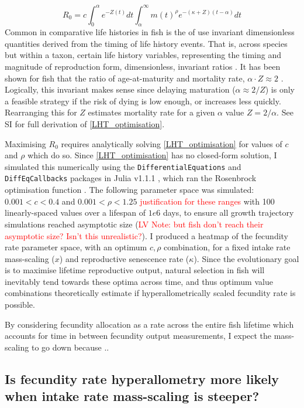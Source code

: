 \documentclass[a4paper]{article} %
\begin{document}
\begin{equation}
    R_{0} = c\int_{0}^{\alpha}e^{-Z(t)}dt\int_{\alpha}^{\infty} m(t)^{\rho} e^{-(\kappa+Z)(t-\alpha)} dt \label{LHT_optimisation}
\end{equation}
Common in comparative life histories in fish is the of use invariant dimensionless quantities derived from the timing of life history events. That is, across species but within a taxon, certain life history variables, representing the timing and magnitude of reproduction form, dimensionless, invariant ratios \autocite{Charnov1990-invariant, Charnov1993}. It has been shown for fish that the ratio of age-at-maturity and mortality rate, $\alpha\cdot Z \approx 2$ \autocite{Charnov1993}. Logically, this invariant makes sense since delaying maturation ($\alpha \approx 2/Z$) is only a feasible strategy if the risk of dying is low enough, or increases less quickly. Rearranging this for $Z$ estimates mortality rate for a given $\alpha$ value $Z = 2/\alpha$.
See SI for full derivation of \cref{LHT_optimisation}.

Maximising $R_0$ requires analytically solving \cref{LHT_optimisation} for values of $c$ and $\rho$ which do so. Since \cref{LHT_optimisation} has no closed-form solution, I simulated this numerically using the \texttt{DifferentialEquations} and \texttt{DiffEqCallbacks} packages in Julia v1.1.1 \autocite{Bezanson2017}, which ran the Rosenbrock optimisation function \autocite{Rosenbrock1960}. The following parameter space was simulated: $0.001 < c < 0.4$ and $0.001 < \rho < 1.25$ \textcolor{red}{justification for these ranges} with 100 linearly-spaced values over a lifespan of $1e6$ days, to ensure all growth trajectory simulations reached asymptotic size (\textcolor{red}{LV Note: but fish don't reach their asymptotic size? Isn't this unrealistic?}). I produced a heatmap of the fecundity rate parameter space, with an optimum $c, \rho$ combination, for a fixed intake rate mass-scaling ($x$) and reproductive senescence rate ($\kappa$). Since the evolutionary goal is to maximise lifetime reproductive output, natural selection in fish will inevitably tend towards these optima across time, and thus optimum value combinations theoretically estimate if hyperallometrically scaled fecundity rate is possible.

By considering fecundity allocation as a rate across the entire fish lifetime which accounts for time in between fecundity output measurements, I expect the mass-scaling to go down because ..

\subsection{Is fecundity rate hyperallometry more likely when intake rate mass-scaling is steeper?}
\end{document}

